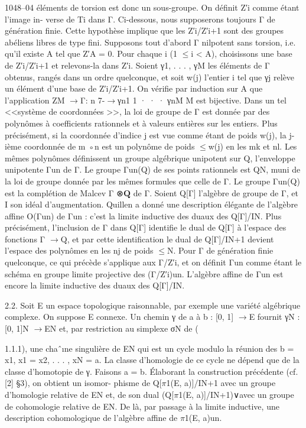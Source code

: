 \documentclass[11pt]{article}
\begin{document}
1048--04 éléments de torsion est donc un sous-groupe. On définit Z′i comme étant l’image in- verse de Ti dans Γ. Ci-dessous, nous supposerons toujours Γ de génération finie. Cette hypothèse implique que les Z′i/Z′i+1 sont des groupes abéliens libres de type fini. Supposons tout d’abord Γ nilpotent sans torsion, i.e. qu’il existe A tel que Z′A = 0. Pour chaque i (1 \(\le\)i < A), choisissons une base de Z′i/Z′i+1 et relevons-la dans Z′i. Soient γ1, . . . , γM les éléments de Γ obtenus, rangés dans un ordre quelconque, et soit w(j) l’entier i tel que γj relève un élément d’une base de Z′i/Z′i+1. On vérifie par induction sur A que l’application ZM \(\to\)Γ: n 7-\(\to\)γn1 1 · · · γnM M est bijective. Dans un tel <<système de coordonnées >>, la loi de groupe de Γ est donnée par des polynômes à coefficients rationnels et à valeurs entières sur les entiers. Plus précisément, si la coordonnée d’indice j est vue comme étant de poids w(j), la j-ième coordonnée de m ◦n est un polynôme de poids \(\le\)w(j) en les mk et nl. Les mêmes polynômes définissent un groupe algébrique unipotent sur Q, l’enveloppe unipotente Γun de Γ. Le groupe Γun(Q) de ses points rationnels est QN, muni de la loi de groupe donnée par les mêmes formules que celle de Γ. Le groupe Γun(Q) est la complétion de Malcev Γ ⊗\(\mathbf Q\) de Γ. Soient Q[Γ] l’algèbre de groupe de Γ, et I son idéal d’augmentation. Quillen a donné une description élégante de l’algèbre affine O(Γun) de Γun : c’est la limite inductive des duaux des Q[Γ]/IN. Plus précisément, l’inclusion de Γ dans Q[Γ] identifie le dual de Q[Γ] à l’espace des fonctions Γ \(\to\)Q, et par cette identification le dual de Q[Γ]/IN+1 devient l’espace des polynômes en les nj de poids \(\le\)N. Pour Γ de génération finie quelconque, ce qui précède s’applique aux Γ/Z′i, et on définit Γun comme étant le schéma en groupe limite projective des (Γ/Z′i)un. L’algèbre affine de Γun est encore la limite inductive des duaux des Q[Γ]/IN. 

2.2. Soit E un espace topologique raisonnable, par exemple une variété algébrique complexe. On suppose E connexe. Un chemin γ de a à b : [0, 1] \(\to\)E fournit γN : [0, 1]N \(\to\)EN et, par restriction au simplexe σN de (

1.1.1), une chaˆıne singulière de EN qui est un cycle modulo la réunion des b = x1, x1 = x2, . . . , xN = a. La classe d’homologie de ce cycle ne dépend que de la classe d’homotopie de γ. Faisons a = b. Élaborant la construction précédente (cf. [2] §3), on obtient un isomor- phisme de Q[\(\pi\)1(E, a)]/IN+1 avec un groupe d’homologie relative de EN et, de son dual (Q[\(\pi\)1(E, a)]/IN+1)∨avec un groupe de cohomologie relative de EN. De là, par passage à la limite inductive, une description cohomologique de l’algèbre affine de \(\pi\)1(E, a)un.
\end{document}
